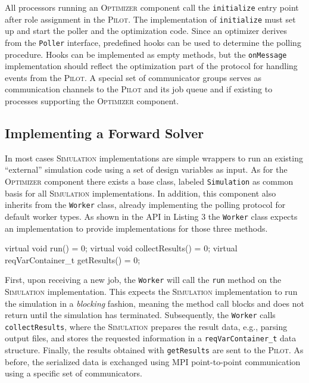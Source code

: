 \documentclass[%
reprint,
amsmath,amssymb,
aps,
]{revtex4-1}
\begin{document}
All processors running an \textsc{Optimizer} component call the
  \texttt{initialize} entry point after role assignment in the
  \textsc{Pilot}.
The implementation of \texttt{initialize} must set up and start the poller and
  the optimization code.
Since an optimizer derives from the \texttt{Poller} interface, predefined
  hooks can be used to determine the polling procedure.
Hooks can be implemented as empty methods, but the \texttt{onMessage}
  implementation should reflect the optimization part of the protocol for
  handling events from the \textsc{Pilot}.
A special set of communicator groups serves as communication channels to the
  \textsc{Pilot} and its job queue and if existing to processes supporting the
  \textsc{Optimizer} component.


\subsection{Implementing a Forward Solver}

In most cases \textsc{Simulation} implementations are simple wrappers to run
  an existing ``external'' simulation code using a set of design variables as
  input.
As for the \textsc{Optimizer} component there exists a base class, labeled
  \texttt{Simulation} as common basis for all \textsc{Simulation}
  implementations.
In addition, this component also inherits from the \texttt{Worker} class,
  already implementing the polling protocol for default worker types.
As shown in the API in Listing 3 the \texttt{Worker} class expects an
  implementation to provide implementations for those three methods.

\begin{code}
virtual void run() = 0;
virtual void collectResults() = 0;
virtual reqVarContainer_t getResults() = 0;
\end{code}

First, upon receiving a new job, the \texttt{Worker} will call the
  \texttt{run} method on the \textsc{Simulation} implementation.
This expects the \textsc{Simulation} implementation to run the simulation in a
  \textit{blocking} fashion, meaning the method call blocks and does not return
  until the simulation has terminated.
Subsequently, the \texttt{Worker} calls \texttt{collectResults}, where the
  \textsc{Simulation} prepares the result data, e.g., parsing output files,
  and stores the requested information in a \texttt{reqVarContainer\_t} data
  structure.
Finally, the results obtained with \texttt{getResults} are sent to the
  \textsc{Pilot}.
As before, the serialized data is exchanged using MPI point-to-point
  communication using a specific set of communicators.
\end{document}
